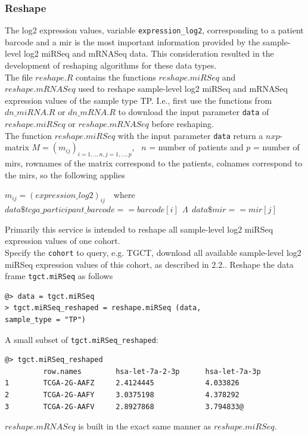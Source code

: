 \documentclass{TechReport}
\begin{document}
\subsubsection{Reshape}
The log2 expression values, variable {\tt expression\_log2}, corresponding to a
patient barcode and a mir is the most important information provided by 
the sample-level log2 miRSeq and mRNASeq data. This consideration resulted in the
development of reshaping algorithms for these data types. \\
The file $reshape.R$ contains the functions $reshape.miRSeq$ and $reshape.mRNASeq$
used to reshape sample-level log2 miRSeq and mRNASeq 
expression values of the sample type TP. I.e., first use the functions from 
$dn\_miRNA.R$ or $dn\_mRNA.R$ to download the input parameter {\tt data}
of $reshape.miRSeq$ or $reshape.mRNASeq$ before reshaping. \\
The function $reshape.miRSeq$ with the input parameter {\tt data} return a
$nxp$-matrix $M = (m_{ij})_{i=1,..,n, j=1,...,p}$, \ $n$ = number of patients and 
$p$ = number of mirs, rownames of the matrix correspond to the patients, colnames
correspond to the mirs,  so the following applies
\begin{center}
$m_{ij}= (expression\_log2)_{ij}$\ \  where \\
$data\$tcga\_participant\_barcode==barcode[i]\ \  \Lambda\ \ data\$mir==mir[j] $
\end{center}
Primarily this service is intended to reshape all sample-level log2 miRSeq
expression values of one cohort. \\
Specify the {\tt cohort} to query, e.g. TGCT, download all available sample-level
log2 miRSeq expression values of this cohort, as described 
in 2.2..
Reshape the data frame {\tt tgct.miRSeq} as follows
\begin{lstlisting}[style=base]
@> data = tgct.miRSeq
> tgct.miRSeq_reshaped = reshape.miRSeq (data, 
sample_type = "TP")
\end{lstlisting}
A small subset of {\tt tgct.miRSeq\_reshaped}:
\begin{lstlisting}[style=base]
@> tgct.miRSeq_reshaped
         row.names        hsa-let-7a-2-3p      hsa-let-7a-3p
1        TCGA-2G-AAFZ     2.4124445            4.033826
2        TCGA-2G-AAFY     3.0375198            4.378292
3        TCGA-2G-AAFV     2.8927868            3.794833@
\end{lstlisting}
$reshape.mRNASeq$ is built in the exact same manner as $reshape.miRSeq$.
\end{document}
